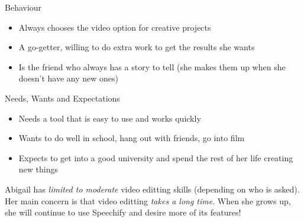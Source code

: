 \documentclass[letterpaper]{article}
\begin{document}
            \begin{multicols}{2}
                \begin{large}
                    Behaviour
                \end{large}
                \begin{itemize}
                    \item Always chooses the video option for creative projects
                    \item A go-getter, willing to do extra work to get the results she wants
                    \item Is the friend who always has  a story to tell (she makes them up when she doesn't have any new ones)
                \end{itemize}
                \begin{large}
                    Needs, Wants and Expectations
                \end{large}
                \begin{itemize}
                    \item Needs a tool that is easy to use and works quickly
                    \item Wants to do well in school, hang out with friends, go into film
                    \item Expects to get into a good university and spend the rest of her life creating new things
                \end{itemize}
            \end{multicols}
            Abigail has \emph{limited to moderate} video editting skills (depending on who is asked). Her main concern is that video editting \emph{takes a long time}. When she grows up, she will continue to use Speechify and desire more of its features!
\end{document}
